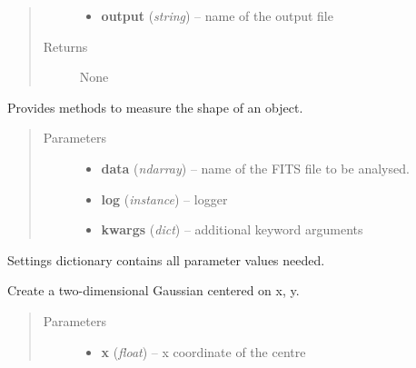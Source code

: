\documentclass[a4paper,11pt,english]{sphinxmanual}
\begin{document}
\begin{fulllineitems}
\begin{fulllineitems}
\begin{quote}
\begin{description}
\begin{itemize}
\item {} 
\textbf{output} (\emph{string}) -- name of the output file

\end{itemize}

\item[{Returns}] \leavevmode
None

\end{description}\end{quote}

\end{fulllineitems}


\end{fulllineitems}


\begin{fulllineitems}
Provides methods to measure the shape of an object.
\begin{quote}\begin{description}
\item[{Parameters}] \leavevmode\begin{itemize}
\item {} 
\textbf{data} (\emph{ndarray}) -- name of the FITS file to be analysed.

\item {} 
\textbf{log} (\emph{instance}) -- logger

\item {} 
\textbf{kwargs} (\emph{dict}) -- additional keyword arguments

\end{itemize}

\end{description}\end{quote}

Settings dictionary contains all parameter values needed.

\begin{fulllineitems}
Create a two-dimensional Gaussian centered on x, y.
\begin{quote}\begin{description}
\item[{Parameters}] \leavevmode\begin{itemize}
\item {} 
\textbf{x} (\emph{float}) -- x coordinate of the centre


\end{itemize}
\end{description}
\end{quote}
\end{fulllineitems}
\end{fulllineitems}
\end{document}
